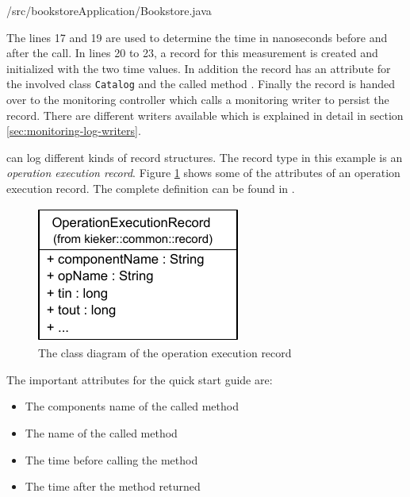 \setJavaCodeListing
%
{\manualInstrumentedBookstoreApplicationDir/src/bookstoreApplication/Bookstore.java}
 
\noindent The lines 17 and 19 are used to determine the time in nanoseconds before and after the  call. In lines 20 to 23, a record for this measurement is created and initialized with the two time values. In addition the record has an attribute for the involved class \verb!Catalog! and the called method . Finally the record is handed over to the monitoring controller which calls a monitoring writer to persist the record. There are different writers available which is explained in detail in section \ref{sec:monitoring-log-writers}.

\Kieker{} can log different kinds of record structures. The record type in this example is an \textit{operation execution record}. Figure \ref{fig:OperationExecutionRecordClassDiagram} shows some of the attributes of an operation execution record. The complete definition can be found in .

\begin{figure}[H]
\begin{centering}
\includegraphics[scale=1]{images/kieker_OperationExecutionRecord-notraceattributes}%
\caption{The class diagram of the operation execution record}
\label{fig:OperationExecutionRecordClassDiagram}
\end{centering}
\end{figure}

\noindent The important attributes for the quick start guide are:

\begin{itemize}
\item[\hskip1em\class{componentName:}] The components name of the called method
\item[\hskip1em\class{opName:}] The name of the called method
\item[\hskip1em\class{tin:}] The time before calling the method
\item[\hskip1em\class{tout:}] The time after the method returned
\end{itemize}

